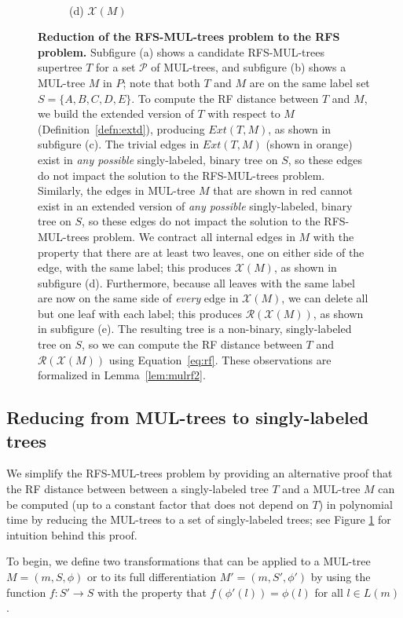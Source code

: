 \begin{figure}[!h]
\begin{subfigure}[t]{0.3\textwidth}
		~
		\caption{(d) $\mathcal{X}(M)$}
	\end{subfigure}
	\caption{
	{\bf Reduction of the RFS-MUL-trees problem to the RFS problem.}
	Subfigure (a) shows a candidate RFS-MUL-trees supertree $T$ for a set $\mathcal{P}$ of MUL-trees, and subfigure (b) shows a MUL-tree $M$ in ${P}$; note that both $T$ and $M$ are on the same label set $S = \{A, B, C, D, E\}$.
    To compute the RF distance between $T$ and $M$, we build the extended version of $T$ with respect to $M$ (Definition~\ref{defn:extd}), producing $Ext(T,M)$, as shown in subfigure (c).
    The trivial edges in $Ext(T,M)$ (shown in orange) exist in {\em any possible} singly-labeled, binary tree on $S$, so these edges do not impact the solution to the RFS-MUL-trees problem.
    Similarly, the edges in MUL-tree $M$ that are shown in red cannot exist in an extended version of {\em any possible} singly-labeled, binary tree on $S$, so these edges do not impact the solution to the RFS-MUL-trees problem.
   We contract all internal edges in $M$ with the property that there are at least two leaves, one on either side of the edge, with the same label; this produces $\mathcal{X}(M)$, as shown in subfigure (d).
    Furthermore, because all leaves with the same label are now on the same side of {\em every} edge in $\mathcal{X}(M)$, we can delete all but one leaf with each label; this produces $\mathcal{R}(\mathcal{X}(M))$, as shown in subfigure (e).
    The resulting tree is a non-binary, singly-labeled tree on $S$, so we can compute the RF distance between $T$ and $\mathcal{R}(\mathcal{X}(M))$ using Equation~\ref{eq:rf}.
    These observations are formalized in Lemma~\ref{lem:mulrf2}.
    }
	\label{fig:1}
\end{figure}

\subsection{Reducing from MUL-trees to singly-labeled trees}
\label{sec:reduction}
We simplify the RFS-MUL-trees problem by providing an alternative proof that the RF distance between between a singly-labeled tree $T$ and a MUL-tree $M$ can be computed (up to a constant factor that does not depend on $T$) in polynomial time by reducing the MUL-trees to a set of singly-labeled trees; see Figure \ref{fig:1} for intuition behind this proof.

To begin, we define two transformations that can be applied to a MUL-tree $M = (m, S, \phi)$ or to its full differentiation $M' = (m, S', \phi')$ by using the function $f: S' \rightarrow S$ with the property that $f(\phi'(l)) = \phi(l)$ for all $l \in L(m)$.

